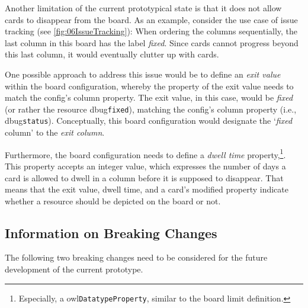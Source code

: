 Another limitation of the current prototypical state is that it does not allow cards to disappear from the board. As an example, consider the use case of issue tracking (see \autoref{fig:06IssueTracking}): When ordering the columns sequentially, the last column in this board has the label \textit{fixed}. Since cards cannot progress beyond this last column, it would eventually clutter up with cards.

One possible approach to address this issue would be to define an \textit{exit value} within the board configuration, whereby the property of the exit value needs to match the config’s column property. The exit value, in this case, would be \textit{fixed} (or rather the resource \acrshort{dbug}\texttt{fixed}), matching the config’s column property (i.e., \acrshort{dbug}\texttt{status}). Conceptually, this board configuration would designate the ‘\textit{fixed} column’ to the \textit{exit column}. 

Furthermore, the board configuration needs to define a \textit{dwell time} property,\footnote{Especially, a \acrshort{owl}\texttt{DatatypeProperty}, similar to the board limit definition.}. This property accepts an integer value, which expresses the number of days a card is allowed to dwell in a column before it is supposed to disappear. That means that the exit value, dwell time, and a card’s modified property indicate whether a resource should be depicted on the board or not.










\subsection*{Information on Breaking Changes}

The following two breaking changes need to be considered for the future development of the current prototype.

